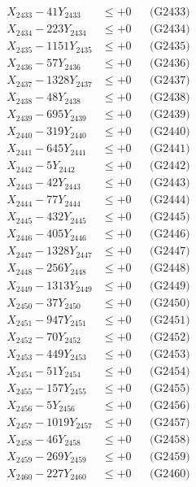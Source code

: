 \documentclass[a4paper,10pt]{article}
\begin{document}
{\begin{align}
X_{2433} - 41Y_{2433} &\leq +0 && \text{(G2433)} \\
X_{2434} - 223Y_{2434} &\leq +0 && \text{(G2434)} \\
X_{2435} - 1151Y_{2435} &\leq +0 && \text{(G2435)} \\
X_{2436} - 57Y_{2436} &\leq +0 && \text{(G2436)} \\
X_{2437} - 1328Y_{2437} &\leq +0 && \text{(G2437)} \\
X_{2438} - 48Y_{2438} &\leq +0 && \text{(G2438)} \\
X_{2439} - 695Y_{2439} &\leq +0 && \text{(G2439)} \\
X_{2440} - 319Y_{2440} &\leq +0 && \text{(G2440)} \\
\allowbreak
X_{2441} - 645Y_{2441} &\leq +0 && \text{(G2441)} \\
X_{2442} - 5Y_{2442} &\leq +0 && \text{(G2442)} \\
X_{2443} - 42Y_{2443} &\leq +0 && \text{(G2443)} \\
X_{2444} - 77Y_{2444} &\leq +0 && \text{(G2444)} \\
X_{2445} - 432Y_{2445} &\leq +0 && \text{(G2445)} \\
X_{2446} - 405Y_{2446} &\leq +0 && \text{(G2446)} \\
X_{2447} - 1328Y_{2447} &\leq +0 && \text{(G2447)} \\
X_{2448} - 256Y_{2448} &\leq +0 && \text{(G2448)} \\
X_{2449} - 1313Y_{2449} &\leq +0 && \text{(G2449)} \\
X_{2450} - 37Y_{2450} &\leq +0 && \text{(G2450)} \\
\allowbreak
X_{2451} - 947Y_{2451} &\leq +0 && \text{(G2451)} \\
X_{2452} - 70Y_{2452} &\leq +0 && \text{(G2452)} \\
X_{2453} - 449Y_{2453} &\leq +0 && \text{(G2453)} \\
X_{2454} - 51Y_{2454} &\leq +0 && \text{(G2454)} \\
X_{2455} - 157Y_{2455} &\leq +0 && \text{(G2455)} \\
X_{2456} - 5Y_{2456} &\leq +0 && \text{(G2456)} \\
X_{2457} - 1019Y_{2457} &\leq +0 && \text{(G2457)} \\
X_{2458} - 46Y_{2458} &\leq +0 && \text{(G2458)} \\
X_{2459} - 269Y_{2459} &\leq +0 && \text{(G2459)} \\
X_{2460} - 227Y_{2460} &\leq +0 && \text{(G2460)} \\

\end{align}}
\end{document}
